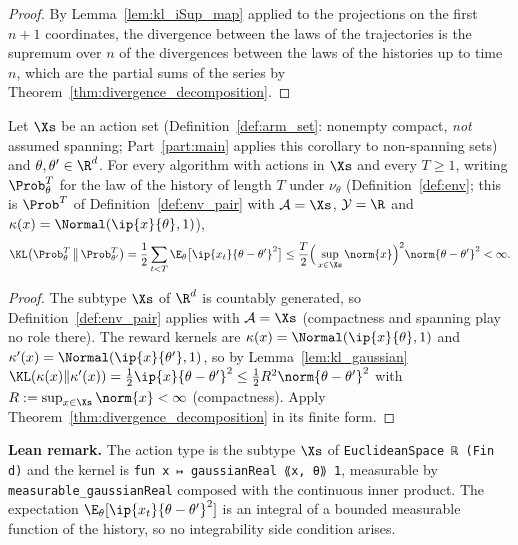 \begin{proof}
\leanok
{}
By Lemma~\ref{lem:kl_iSup_map} applied to the projections on the first $n+1$ coordinates, the
divergence between the laws of the trajectories is the supremum over $n$ of the divergences
between the laws of the histories up to time $n$, which are the partial sums of the series by
Theorem~\ref{thm:divergence_decomposition}.
\end{proof}

\begin{corollary}
\label{cor:divergence_decomposition_gaussian}
\leanok
{}
Let $\Xs$ be an action set (Definition~\ref{def:arm_set}: nonempty compact, \emph{not}
assumed spanning; Part~\ref{part:main} applies this corollary to non-spanning sets) and
$\theta,\theta'\in\R^d$. For every
algorithm with actions in $\Xs$ and every $T \ge 1$, writing $\Prob_\theta^T$ for the law of the
history of length $T$ under $\nu_\theta$ (Definition~\ref{def:env}; this is $\Prob^T$ of
Definition~\ref{def:env_pair} with $\mathcal{A} = \Xs$, $\mathcal{Y} = \R$ and
$\kappa(x) = \Normal(\ip{x}{\theta},1)$),
\[
  \KL\big(\Prob_\theta^T\,\big\|\,\Prob_{\theta'}^T\big)
  = \frac12\sum_{t<T}\E_\theta\big[\ip{x_t}{\theta-\theta'}^2\big]
  \le \frac{T}{2}\Big(\sup_{x\in\Xs}\norm{x}\Big)^2\norm{\theta-\theta'}^2 < \infty .
\]
\end{corollary}

\begin{proof}
\leanok
{}
The subtype $\Xs$ of $\R^d$ is countably generated, so Definition~\ref{def:env_pair}
applies with $\mathcal{A} = \Xs$ (compactness and spanning play no role there). The reward
kernels are $\kappa(x) = \Normal(\ip{x}{\theta},1)$ and
$\kappa'(x) = \Normal(\ip{x}{\theta'},1)$, so by Lemma~\ref{lem:kl_gaussian}
$\KL(\kappa(x)\|\kappa'(x)) = \tfrac12\ip{x}{\theta-\theta'}^2 \le \tfrac12 R^2\norm{\theta-\theta'}^2$
with $R := \sup_{x\in\Xs}\norm{x} < \infty$ (compactness). Apply
Theorem~\ref{thm:divergence_decomposition} in its finite form.
\end{proof}

\textbf{Lean remark.} The action type is the subtype $\Xs$ of \texttt{EuclideanSpace ℝ (Fin d)}
and the kernel is \texttt{fun x ↦ gaussianReal ⟪x, θ⟫ 1}, measurable by
\texttt{measurable\_gaussianReal} composed with the continuous inner product. The expectation
$\E_\theta[\ip{x_t}{\theta-\theta'}^2]$ is an integral of a bounded measurable function of the
history, so no integrability side condition arises.
